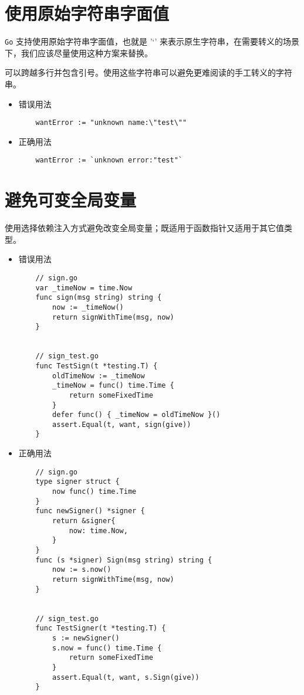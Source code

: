 \section{使用原始字符串字面值}
\texttt{Go} 支持使用原始字符串字面值，也就是 '`' 来表示原生字符串，在需要转义的场景下，我们应该尽量使用这种方案来替换。

可以跨越多行并包含引号。使用这些字符串可以避免更难阅读的手工转义的字符串。

\begin{itemize}[leftmargin=4em]
\item 错误用法

  \begin{verbatim}
    wantError := "unknown name:\"test\""
  \end{verbatim}
\item 正确用法

  \begin{verbatim}
    wantError := `unknown error:"test"`
  \end{verbatim}
\end{itemize}

\section{避免可变全局变量}
使用选择依赖注入方式避免改变全局变量；既适用于函数指针又适用于其它值类型。
\begin{itemize}[leftmargin=4em]
\item 错误用法

  \begin{verbatim}
    // sign.go
    var _timeNow = time.Now
    func sign(msg string) string {
    	now := _timeNow()
    	return signWithTime(msg, now)
    }


    // sign_test.go
    func TestSign(t *testing.T) {
    	oldTimeNow := _timeNow
    	_timeNow = func() time.Time {
    		return someFixedTime
    	}
    	defer func() { _timeNow = oldTimeNow }()
    	assert.Equal(t, want, sign(give))
    }
  \end{verbatim}
\item 正确用法

  \begin{verbatim}
    // sign.go
    type signer struct {
    	now func() time.Time
    }
    func newSigner() *signer {
    	return &signer{
    		now: time.Now,
    	}
    }
    func (s *signer) Sign(msg string) string {
    	now := s.now()
    	return signWithTime(msg, now)
    }


    // sign_test.go
    func TestSigner(t *testing.T) {
    	s := newSigner()
    	s.now = func() time.Time {
    		return someFixedTime
    	}
    	assert.Equal(t, want, s.Sign(give))
    }
  \end{verbatim}
\end{itemize}
